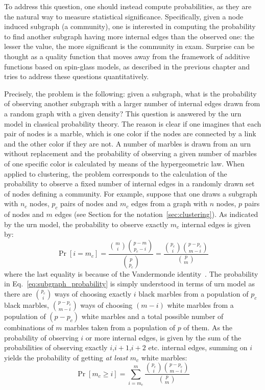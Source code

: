 To address this question, one should instead compute probabilities, as they are the natural way to measure statistical significance.
Specifically, given a node induced subgraph (a community), one is interested in computing the probability to find another subgraph having more internal edges than the observed one: the lesser the value, the more significant is the community in exam. Surprise can be thought as a quality function that moves away from the framework of additive functions based on spin-glass models, as described in the previous chapter and tries to address these questions quantitatively.

Precisely, the problem is the following: given a subgraph, what is the probability of observing another subgraph with a larger number of internal edges drawn from a random graph with a given density?
This question is answered by the urn model in classical probability theory. The reason is clear if one imagines that each pair of nodes is a marble, which is one color if the nodes are connected by a link and the other color if they are not.
A number of marbles is drawn from an urn without replacement and the probability of observing a given number of marbles of one specific color is calculated by means of the hypergeometric law.
When applied to clustering, the problem corresponds to the calculation of the probability to observe a fixed number of internal edges in a randomly drawn set of nodes defining a community.
For example, suppose that one draws a subgraph with $n_c$ nodes, $p_c$ pairs of nodes and $m_c$ edges from a graph with $n$ nodes, $p$ pairs of nodes and $m$ edges (see Section for the notation~\ref{sec:clustering}).
As indicated by the urn model, the probability to observe exactly $m_c$ internal edges is given by:
\begin{equation}\label{eq:subgraph_probability}
\Pr[i=m_c] = \frac{\binom{m}{i}\binom{p-m}{p_c-i} }{\binom{p}{p_c}} = \frac{\binom{p_c}{i} \binom{p-p_c}{m-i}}{\binom{p}{m}}
\end{equation}
where the last equality is because of the Vandermonde identity~\cite{feller1968}.
The probability in Eq.~\ref{eq:subgraph_probability} is simply understood in terms of urn model as there are $\binom{p_c}{i}$ ways of choosing exactly $i$ black marbles from a population of $p_c$ black marbles, $\binom{p-p_c}{m-i}$ ways of choosing $(m-i)$ white marbles from a population of $(p-p_c)$ white marbles and a total possible number of combinations of $m$ marbles taken from a population of $p$ of them.
As the probability of observing $i$ or more internal edges, is given by the sum of the probabilities of observing exactly $i$,$i+1$,$i+2$ etc. internal edges, summing on $i$ yields the probability of getting \emph{at least} $m_c$ white marbles:
\begin{equation}\label{eq:subgraph_probability_marginalized}
\Pr[ m_c \geq i ] = \sum\limits_{i=m_c}^{m} \frac{\binom{p_c}{i} \binom{p-p_c}{m-i}}{\binom{p}{m}}
\end{equation}

